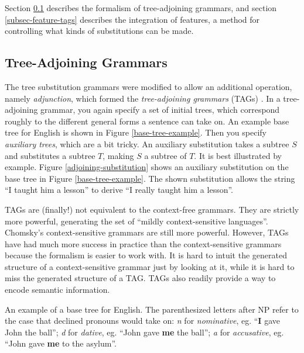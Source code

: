\documentclass[12pt]{article}
\newcommand{\defn}[1]{\textit{#1}}
\begin{document}
Section \ref{subsec-tags} describes the formalism of tree-adjoining
grammars, and section \ref{subsec-feature-tags} describes the
integration of features, a method for controlling what kinds of
substitutions can be made.

\subsection{Tree-Adjoining Grammars}
\label{subsec-tags}

The tree substitution grammars were modified to allow an additional
operation, namely \defn{adjunction}, which formed the
\defn{tree-adjoining grammars} (TAGs) \cite{Joshi-1975}.  In a tree-adjoining grammar, you
again specify a set of initial trees, which correspond roughly to the
different general forms a sentence can take on.  An example base tree
for English is shown in Figure \ref{base-tree-example}.  Then you
specify \defn{auxiliary trees}, which are a bit tricky.  An auxiliary
substitution takes a subtree $S$ and substitutes a subtree $T$, making
$S$ a subtree of $T$.  It is best illustrated by example.  Figure
\ref{adjoining-substitution} shows an auxiliary substitution on the base
tree in Figure \ref{base-tree-example}.  The shown substitution allows
the string ``I taught him a lesson'' to derive ``I really taught him a
lesson''.

TAGs are (finally!) not equivalent to the context-free grammars.  They
are strictly more powerful, generating the set of ``mildly
context-sensitive languages''.  Chomsky's context-sensitive grammars are
still more powerful.  However, TAGs have had much more success in
practice than the context-sensitive grammars because the formalism is
easier to work with.  It is hard to intuit the generated structure of a
context-sensitive grammar just by looking at it, while it is hard to
miss the generated structure of a TAG.  TAGs also readily provide a way
to encode semantic information.

\begin{Figure}
\begin{center}
\end{center}
\caption{An example of a base tree for English.  The parenthesized
letters after NP refer to the case that declined pronouns would take on:
\textit{n} for \defn{nominative}, eg. ``\textbf{I} gave John the
ball''; \textit{d} for \defn{dative}, eg. ``John gave \textbf{me} the
ball''; \textit{a} for \defn{accusative}, eg.  ``John gave \textbf{me}
to the asylum''.}
\label{base-tree-example}
\end{Figure}
\end{document}
